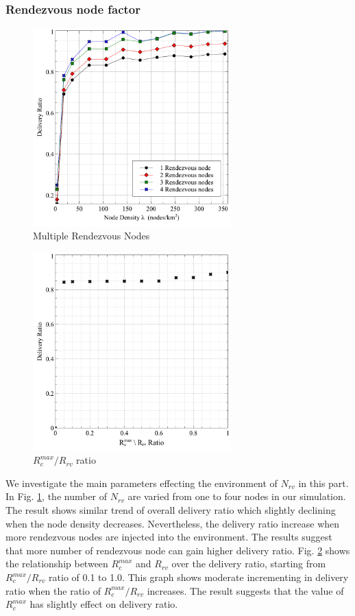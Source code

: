 \subsubsection{Rendezvous node factor}
\begin{figure}[!t]
	\centering
	\includegraphics[width=3in]{Graphs/MultipleRVs.pdf}
	\caption{Multiple Rendezvous Nodes}
	\label{Multiple Rendezvous Nodes}
\end{figure}
\begin{figure}[!t]
\centering
\includegraphics[width=3in]{Graphs/RcmaxRrv.pdf}
\caption{$R_c^{max}/R_{rv}$ ratio}
\label{$R_c^{max}/R_{rv}$ ratio}
\end{figure}
We investigate the main parameters effecting the environment of $N_{rv}$ in this part.
In Fig. \ref{Multiple Rendezvous Nodes}, the number of $N_{rv}$ are varied from one to four nodes in our simulation.
The result shows similar trend of overall delivery ratio which slightly declining when the node density decreases.
Nevertheless, the delivery ratio increase when more rendezvous nodes are injected into the environment.
The results suggest that more number of rendezvous node can gain higher delivery ratio.
Fig. \ref{$R_c^{max}/R_{rv}$ ratio} shows the relationship between $R_c^{max}$ and $R_{rv}$ over the delivery ratio, starting from  $R_c^{max}/R_{rv}$ ratio of 0.1 to 1.0.
This graph shows moderate incrementing in delivery ratio when the ratio of $R_c^{max}/R_{rv}$ increases.
The result suggests that the value of $R_c^{max}$ has slightly effect on delivery ratio.

